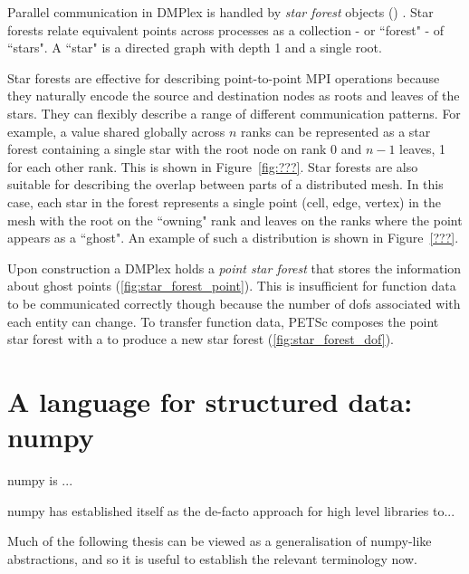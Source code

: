 \documentclass[thesis]{subfiles}
\begin{document}
Parallel communication in DMPlex is handled by \textit{star forest} objects () \parencite{zhangPetscSFScalableCommunication2021}.
Star forests relate equivalent points across processes as a collection - or ``forest" - of ``stars".
A ``star" is a directed graph with depth 1 and a single root.

Star forests are effective for describing point-to-point MPI operations because they naturally encode the source and destination nodes as roots and leaves of the stars.
They can flexibly describe a range of different communication patterns.
For example, a value shared globally across $n$ ranks can be represented as a star forest containing a single star with the root node on rank 0 and $n-1$ leaves, 1 for each other rank.
This is shown in Figure~\ref{fig:???}.
Star forests are also suitable for describing the overlap between parts of a distributed mesh.
In this case, each star in the forest represents a single point (cell, edge, vertex) in the mesh with the root on the ``owning" rank and leaves on the ranks where the point appears as a ``ghost".
An example of such a distribution is shown in Figure~\ref{???}.


Upon construction a DMPlex holds a \textit{point star forest} that stores the information about ghost points (\cref{fig:star_forest_point}).
This is insufficient for function data to be communicated correctly though because the number of \glspl{dof} associated with each entity can change.
To transfer function data, PETSc composes the point star forest with a  to produce a new star forest (\cref{fig:star_forest_dof}).

\section{A language for structured data: numpy}

numpy is ...

numpy has established itself as the de-facto approach for high level libraries to...

Much of the following thesis can be viewed as a generalisation of numpy-like abstractions, and so it is useful to establish the relevant terminology now.

\end{document}

